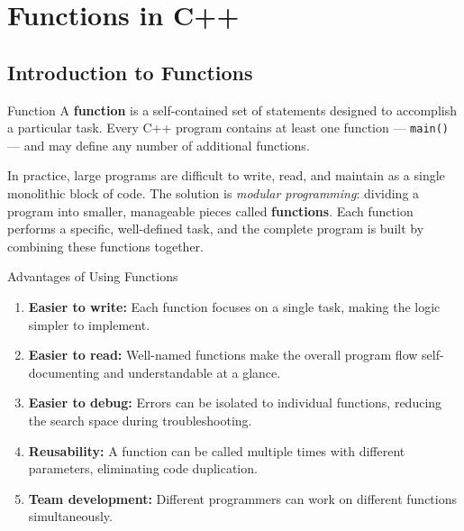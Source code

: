 
\chapter{Functions in C++}
\label{ch:functions}

\section{Introduction to Functions}
\label{sec:intro-functions}

\begin{definitionbox}{Function}
A \textbf{function} is a self-contained set of statements designed to accomplish
a particular task. Every C++ program contains at least one function ---
\texttt{main()} --- and may define any number of additional functions.
\end{definitionbox}

In practice, large programs are difficult to write, read, and maintain as a
single monolithic block of code. The solution is \emph{modular programming}:
dividing a program into smaller, manageable pieces called \textbf{functions}.
Each function performs a specific, well-defined task, and the complete program
is built by combining these functions together.

\begin{infobox}{Advantages of Using Functions}
\begin{enumerate}
    \item \textbf{Easier to write:} Each function focuses on a single task,
          making the logic simpler to implement.
    \item \textbf{Easier to read:} Well-named functions make the overall
          program flow self-documenting and understandable at a glance.
    \item \textbf{Easier to debug:} Errors can be isolated to individual
          functions, reducing the search space during troubleshooting.
    \item \textbf{Reusability:} A function can be called multiple times with
          different parameters, eliminating code duplication.
    \item \textbf{Team development:} Different programmers can work on
          different functions simultaneously.
\end{enumerate}
\end{infobox}

